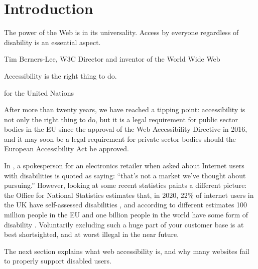 \section{Introduction}

\epigraph{The power of the Web is in its universality. Access by everyone regardless
  of disability is an essential aspect.}{Tim Berners-Lee, W3C Director and inventor of the World Wide Web}

\epigraph{Accessibility is the right thing to do.}{ for the United Nations}

\noindent
After more than twenty years, we have reached a tipping point: accessibility is not only
the right thing to do, but it is a legal requirement for public sector bodies in the EU
since the approval of the Web Accessibility Directive in 2016, and it may soon be a legal
requirement for private sector bodies should the European Accessibility Act be approved.

In , a spokesperson for an electronics retailer when asked about
Internet users with disabilities is quoted as saying: ``that's not a market we've thought
about pursuing.'' However, looking at some recent statistics paints a different picture:
the Office for National Statistics estimates that, in 2020, 22\% of internet users in the
UK have self-assessed disabilities \citeyear{ukinternetusers2020}, and according to different
estimates 100 million people in the EU and one billion people in the world have some form
of disability \cite{euWebAccessibility2021, whoDisability2021}. Voluntarily excluding such
a huge part of your customer base is at best shortsighted, and at worst illegal in the near future.

The next section explains what web accessibility is, and why many websites fail to properly
support disabled users.
